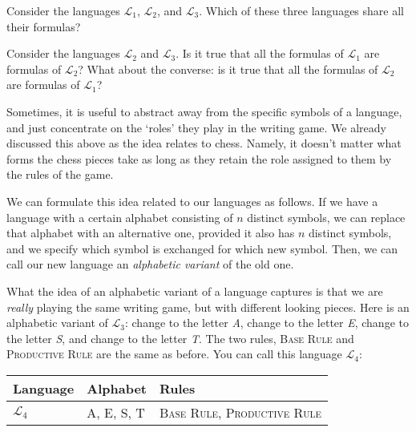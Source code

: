 
\begin{exc}
Consider the languages $\mathcal{L}_1$, $\mathcal{L}_2$, and $\mathcal{L}_3$. Which of these three languages share all their formulas? 
\end{exc}

\begin{exc}
Consider the languages $\mathcal{L}_2$ and $\mathcal{L}_3$. Is it true that all the formulas of $\mathcal{L}_1$ are formulas of $\mathcal{L}_2$? What about the converse: is it true that all the formulas of $\mathcal{L}_2$ are formulas of $\mathcal{L}_1$?
\end{exc}

Sometimes, it is useful to abstract away from the specific symbols of a language, and just concentrate on the `roles' they play in the writing game. We already discussed this above as the idea relates to chess. Namely, it doesn't matter what forms the chess pieces take as long as they retain the role assigned to them by the rules of the game. 

We can formulate this idea related to our languages as follows. If we have a language with a certain alphabet consisting of $n$ distinct symbols, we can replace that alphabet with an alternative one, provided it also has $n$ distinct symbols, and we specify which symbol is exchanged for which new symbol. Then, we can call our new language an \textit{alphabetic variant} of the old one. \label{alphvar}

What the idea of an alphabetic variant of a language captures is that we are \textit{really} playing the same writing game, but with different looking pieces. Here is an alphabetic variant of $\mathcal{L}_3$: change \bcirc{} to the letter \textit{A}, change \bbox{} to the letter \textit{E}, change \btri{} to the letter \textit{S}, and change \bstar{} to the letter \textit{T}. The two rules, \textsc{Base Rule} and \textsc{Productive Rule} are the same as before. You can call this language $\mathcal{L}_4$:

\begin{center}
	\begin{tabular}{lll}
		\textbf{Language} & \textbf{Alphabet} & \textbf{Rules} \\\hline
		$\mathcal{L}_4$ & A, E, S, T & \textsc{Base Rule}, \textsc{Productive Rule}
	\end{tabular}
\end{center}


